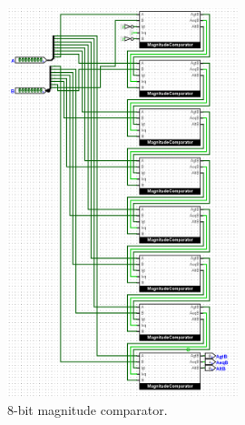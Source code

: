 \documentclass{article}
\begin{document}
\begin{figure}[H]
    \centering
    \includegraphics[width=0.6\textwidth]{./images/8-bit_comparator.png}
    \caption{8-bit magnitude comparator.}
\end{figure}
\end{document}
